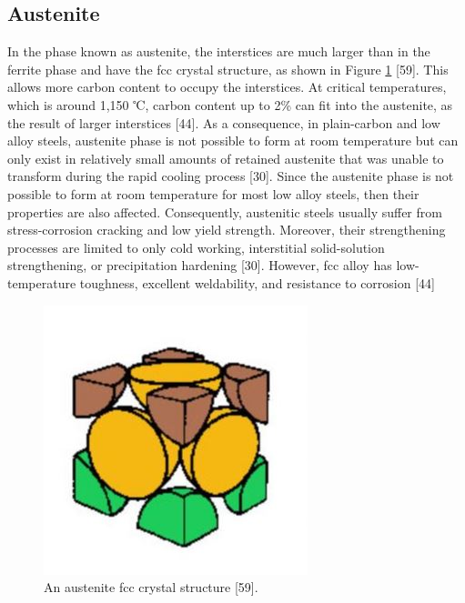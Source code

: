 \documentclass[12pt]{report}
\begin{document}
\subsection{Austenite} 
In the phase known as austenite, the interstices are much larger than in the ferrite phase and have the fcc crystal structure, as shown in Figure \ref{ch3:figure:austenite} [59]. This allows more carbon content to occupy the interstices. At critical temperatures, which is around 1,150 ℃, carbon content up to 2\% can fit into the austenite, as the result of larger interstices [44]. As a consequence, in plain-carbon and low alloy steels, austenite phase is not possible to form at room temperature but can only exist in relatively small amounts of retained austenite that was unable to transform during the rapid cooling process [30].
Since the austenite phase is not possible to form at room temperature for most low alloy steels, then their properties are also affected. Consequently, austenitic steels usually suffer from stress-corrosion cracking and low yield strength. Moreover, their strengthening processes are limited to only cold working, interstitial solid-solution strengthening, or precipitation hardening [30]. However, fcc alloy has low-temperature toughness, excellent weldability, and resistance to corrosion [44]
 
\begin{figure}[H]
    \centering
    \includegraphics[width=.45\textwidth]{austenite_fcc_crystal_structure.jpg}
    \caption{An austenite fcc crystal structure [59].}
    \label{ch3:figure:austenite}
\end{figure}
\end{document}

